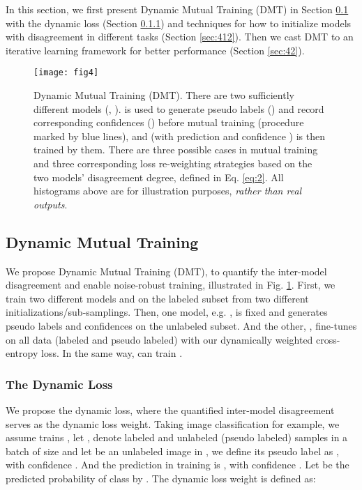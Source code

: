\documentclass[preprint,review,10pt]{elsarticle}
\begin{document}
In this section, we first present Dynamic Mutual Training (DMT) in Section \ref{sec:41} with the dynamic loss (Section \ref{sec:411}) and techniques for how to initialize models with disagreement in different tasks (Section \ref{sec:412}). Then we cast DMT to an iterative learning framework for better performance (Section \ref{sec:42}).

\begin{figure}[t]
\centering
\texttt{[image: fig4]}
\caption{Dynamic Mutual Training (DMT). There are two sufficiently different models (, ).  is used to generate pseudo labels () and record corresponding confidences () before mutual training (procedure marked by blue lines), and  (with prediction  and confidence ) is then trained by them. There are three possible cases in mutual training and three corresponding loss re-weighting strategies based on the two models' disagreement degree, defined in Eq. \ref{eq:2}. All histograms above are for illustration purposes, \textit{rather than real outputs}. }
\label{fig4}
\end{figure}

\subsection{Dynamic Mutual Training}
\label{sec:41}


We propose Dynamic Mutual Training (DMT), to quantify the inter-model disagreement and enable noise-robust training, illustrated in Fig. \ref{fig4}. First, we train two different models  and  on the labeled subset from two different initializations/sub-samplings. Then, one model, e.g. , is fixed and generates pseudo labels and confidences on the unlabeled subset. And the other, , fine-tunes on all data (labeled and pseudo labeled) with our dynamically weighted cross-entropy loss. In the same way,  can train .


\subsubsection{The Dynamic Loss}
\label{sec:411}
We propose the dynamic loss, where the quantified inter-model disagreement serves as the dynamic loss weight. Taking image classification for example, we assume  trains , let ,  denote labeled and unlabeled (pseudo labeled) samples in a batch of size  and let  be an unlabeled image in , we define its pseudo label as , with confidence . And the prediction in training is , with confidence . Let  be the predicted probability of class  by . The dynamic loss weight  is defined as:
\end{document}

